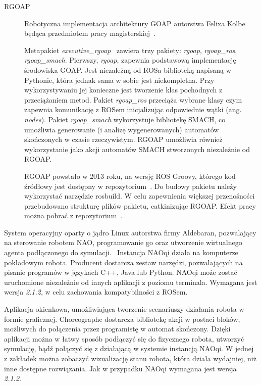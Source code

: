 \begin{description}
{\begin{description}
\item[RGOAP] {Robotyczna implementacja architektury GOAP autorstwa Felixa Kolbe będąca przedmiotem pracy magisterskiej~\cite{KOLB}.  

Metapakiet \textit{executive\_rgoap}~\cite{EXECrgoap} zawiera trzy pakiety: \textit{rgoap}, \textit{rgoap\_ros}, \textit{rgoap\_smach}. Pierwszy, \textit{rgoap}, zapewnia podstawową implementację środowiska GOAP. Jest niezależną od ROSa biblioteką napisaną w Pythonie, która jednak sama w sobie jest niekompletna. Przy wykorzystywaniu jej konieczne jest tworzenie klas pochodnych z przeciążaniem metod. Pakiet \textit{rgoap\_ros} przeciąża wybrane klasy czym zapewnia komunikację z ROSem inicjalizując odpowiednie wątki (ang. \textit{nodes}). Pakiet \textit{rgoap\_smach} wykorzystuje bibliotekę SMACH, co umożliwia generowanie (i analizę wygenerowanych) automatów skończonych w czasie rzeczywistym. 
RGOAP umożliwia również wykorzystanie jako akcji automatów SMACH stworzonych niezależnie od RGOAP.

RGOAP powstało w 2013 roku, na wersję ROS Groovy,\cite{EXECrgoap} którego kod źródłowy jest dostępny w repozytorium~\cite{KOLBrgoap}. Do budowy pakietu należy wykorzystać narzędzie rosbuild. W celu zapewnienia większej przenośności przebudowano strukturę plików pakietu, catkinizując RGOAP. Efekt pracy można pobrać z repozytorium~\cite{TARNrgoap}.

}
\end{description}
\item[NAOqi 2.1.2] {System operacyjny oparty o jądro Linux autorstwa firmy Aldebaran, pozwalający na sterowanie robotem NAO, programowanie go oraz utworzenie wirtualnego agenta podłączonego do symulacji.~\cite{NAOqi} Instancja NAOqi działa na komputerze pokładowym robota. Producent dostarcza zestaw narzędzi, pozwalających na pisanie programów w językach C++, Java lub Python. NAOqi może zostać uruchomione niezależnie od innych aplikacji z poziomu terminala. Wymagana jest wersja \textit{2.1.2}, w celu zachowania kompatybilności z ROSem.~\cite{ROSnaoinstall}}

\item[Choreographe 2.1.2] {Aplikacja okienkowa, umożliwiająca tworzenie scenariuszy działania robota w formie graficznej. Choreographe dostarcza bibliotekę akcji w postaci bloków, możliwych do połączenia przez programistę w automat skończony. Dzięki aplikacji można w łatwy sposób podłączyć się do fizycznego robota, utworzyć symulację, bądź połączyć się z działającą w systemie instancją NAOqi. W jednej z zakładek można zobaczyć wizualizację stanu robota, która działa wydajniej, niż inne dostępne rozwiązania. Jak w przypadku NAOqi wymagana jest wersja \textit{2.1.2}.~\cite{ROSnaoinstall}}
}
\end{description}



